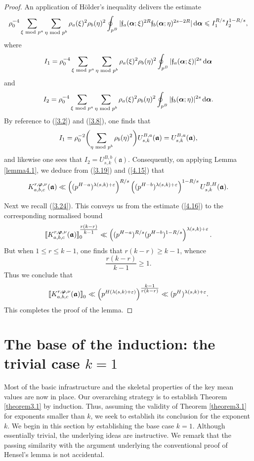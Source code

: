 \documentclass[12pt,reqno]{amsart}
\theoremstyle{definition}
\theoremstyle{remark}
\numberwithin{equation}{section}
\newcommand{\nmod}[1]{\,\,\text{\rm mod}\,\,#1}
\def\gra{{\mathfrak a}}\def\grA{{\mathfrak A}}\def\bfgra{{\boldsymbol \gra}}
\def\grf{{\mathfrak f}}\def\grF{{\mathfrak F}}
\def\lam{{\lambda}} \def\Lam{{\Lambda}} \def\Lamtil{{\widetilde \Lambda}}
\def\eps{\varepsilon}
\def\le{\leqslant} \def\ge{\geqslant} \def\pleq{\preccurlyeq} \def\ple{\prec}
\def\d{{\,{\rm d}}}
\newcommand{\rrbracketsub}[1]{\rrbracket_{\textstyle{_#1}}}
\begin{document}
\begin{proof} An application of H\"older's inequality delivers the estimate
\begin{equation}\label{4.15}
\rho_0^{-4}\sum_{\xi\nmod{p^a}}\sum_{\eta\nmod{p^b}}\rho_a(\xi)^2\rho_b(\eta)^2
\oint_{p^B}|\grf_a(\bfalp;\xi)^{2R}\grf_b(\bfalp;\eta)^{2s-2R}|\d\bfalp \le 
I_1^{R/s}I_2^{1-R/s},
\end{equation}
where
$$I_1=\rho_0^{-4}\sum_{\xi\nmod{p^a}}\sum_{\eta\nmod{p^b}}\rho_a(\xi)^2
\rho_b(\eta)^2\oint_{p^B}|\grf_a(\bfalp;\xi)|^{2s}\d\bfalp $$
and
$$I_2=\rho_0^{-4}\sum_{\xi\nmod{p^a}}\sum_{\eta\nmod{p^b}}\rho_a(\xi)^2
\rho_b(\eta)^2\oint_{p^B}|\grf_b(\bfalp;\eta)|^{2s}\d\bfalp .$$
By reference to (\ref{3.2}) and (\ref{3.8}), one finds that
$$I_1=\rho_0^{-2}\biggl( \sum_{\eta\nmod{p^b}}\rho_b(\eta)^2\biggr) 
U_{s,k}^{B,a}(\bfgra)=U_{s,k}^{B,a}(\bfgra),$$
and likewise one sees that $I_2=U_{s,k}^{B,b}(\gra)$. Consequently, on applying Lemma 
\ref{lemma4.1}, we deduce from (\ref{3.19}) and (\ref{4.15}) that
\begin{equation}\label{4.16}
K_{a,b,c}^{r,\bfvarphi,\nu}(\bfgra)\ll \left( (p^{H-a})^{\lam(s,k)+\eps}\right)^{R/s}
\left( (p^{H-b})^{\lam(s,k)+\eps}\right)^{1-R/s}U_{s,k}^{B,H}(\bfgra).
\end{equation}

\par Next we recall (\ref{3.24}). This conveys us from the estimate (\ref{4.16}) to the 
corresponding normalised bound
$$\llbracket K_{a,b,c}^{r,\bfvarphi,\nu}(\bfgra)
\rrbracketsub{0}^{\textstyle{\frac{r(k-r)}{k-1}}}\ll 
\left( (p^{H-a})^{R/s}(p^{H-b})^{1-R/s}\right)^{\lam(s,k)+\eps}.$$
But when $1\le r\le k-1$, one finds that $r(k-r)\ge k-1$, whence
$$\frac{r(k-r)}{k-1}\ge 1.$$
Thus we conclude that
$$\llbracket K_{a,b,c}^{r,\bfvarphi,\nu}(\bfgra)\rrbracketsub{0}\ll 
\left( p^{H(\lam(s,k)+\eps)}\right)^{\textstyle{\frac{k-1}{r(k-r)}}}\ll 
(p^H)^{\lam(s,k)+\eps}.$$
This completes the proof of the lemma.
\end{proof}

\section{The base of the induction: the trivial case $k=1$} Most of the basic infrastructure 
and the skeletal properties of the key mean values are now in place. Our overarching 
strategy is to establish Theorem \ref{theorem3.1} by induction. Thus, assuming the validity 
of Theorem \ref{theorem3.1} for exponents smaller than $k$, we seek to establish its 
conclusion for the exponent $k$. We begin in this section by establishing the base case 
$k=1$. Although essentially trivial, the underlying ideas are instructive. We remark that the 
passing similarity with the argument underlying the conventional proof of Hensel's lemma is 
not accidental.
\end{document}
